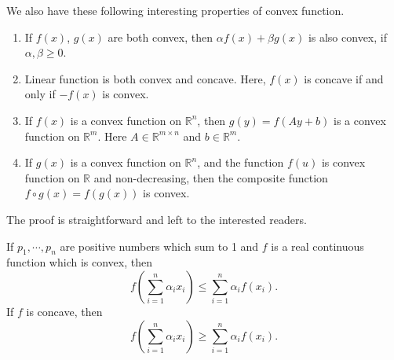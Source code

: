 We also have these following interesting properties of convex function. 

\begin{proposition} 
	\begin{enumerate}
		\item If $f(x)$, $g(x)$ are both convex, then $\alpha f(x) + \beta g(x)$ is also convex, if $\alpha, \beta \geq 0$.
		\item  Linear function is both convex and concave. Here, $f(x)$ is concave if and only if $-f(x)$ is convex.
		\item If $f(x)$ is a convex function on $\mathbb{R}^n$, then $g(y) = f(Ay+b)$ is a convex function on $\mathbb{R}^m$. Here $A \in \mathbb{R}^{m \times n}$ and $b\in \mathbb{R}^m$. 
		\item  If $g(x)$ is a convex function on $\mathbb{R}^n$, and the function $f(u)$ is convex function on $\mathbb{R}$ and non-decreasing, then the composite function $f \circ g(x) = f(g(x))$ is convex.
	\end{enumerate}
\end{proposition}
The proof is straightforward and left to the interested readers.

\begin{theorem}
If $p_1, \cdots, p_n$ are positive numbers which sum to 1 and $f$ is a real continuous function which is convex, then
$$
f(\sum_{i=1}^n\alpha_ix_i)\le \sum_{i=1}^n \alpha_if(x_i).
$$
If $f$ is concave, then
$$
f(\sum_{i=1}^n\alpha_ix_i)\ge \sum_{i=1}^n \alpha_if(x_i).
$$
\end{theorem}
